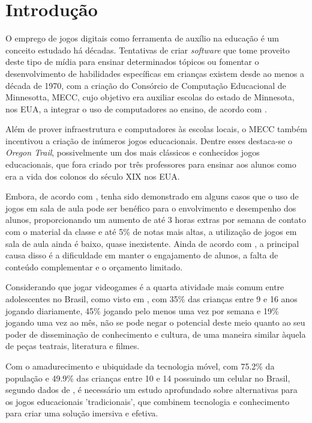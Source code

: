 \chapter{Introdução}

O emprego de jogos digitais como ferramenta de auxílio na 
educação é um conceito estudado há décadas. Tentativas de 
criar \textit{software} que tome proveito deste tipo de 
mídia para ensinar determinados tópicos ou fomentar o 
desenvolvimento de habilidades específicas em crianças 
existem desde ao menos a década de 1970, com a criação do 
Consórcio de Computação Educacional de Minnesotta, MECC, 
cujo objetivo era auxiliar escolas do estado de Minnesota, 
nos EUA, a integrar o uso de computadores ao ensino, de 
acordo com \cite{lussenhop:2016:oregon-trail}.

Além de prover infraestrutura e computadores às escolas 
locais, o MECC também incentivou a criação de inúmeros 
jogos educacionais. Dentre esses destaca-se o 
\textit{Oregon Trail}, possivelmente um dos mais 
clássicos e conhecidos jogos educacionais, que fora 
criado por três professores para ensinar aos alunos 
como era a vida dos colonos do século XIX nos EUA. 

Embora, de acordo com \cite{poli:2012:video-game-spore}, 
tenha sido demonstrado em alguns casos que o uso de 
jogos em sala de aula pode ser benéfico para o 
envolvimento e desempenho dos alunos, proporcionando 
um aumento de até 3 horas extras por semana de contato 
com o material da classe e até 5\% de notas mais 
altas, a utilização de jogos em sala de aula ainda 
é baixo, quase inexistente. Ainda de acordo com 
\cite{poli:2012:video-game-spore}, a principal causa 
disso é a dificuldade em manter o engajamento de 
alunos, a falta de conteúdo complementar e o orçamento 
limitado.

Considerando que jogar videogames é a quarta atividade 
mais comum entre adolescentes no Brasil, como visto em 
\cite{bndes:2014:mapeamento}, com 35\% das crianças 
entre 9 e 16 anos jogando diariamente, 45\% jogando 
pelo menos uma vez por semana e 19\% jogando uma vez 
ao mês, não se pode negar o potencial deste meio quanto 
ao seu poder de disseminação de conhecimento e cultura, 
de uma maneira similar àquela de peças teatrais, 
literatura e filmes.

Com o amadurecimento e ubiquidade da tecnologia móvel, 
com 75.2\% da população e 49.9\% das crianças entre 10 
e 14 possuindo um celular no Brasil, segundo dados de 
\cite{IBGE:2015:PNAD_TIC_2013}, é necessário um estudo 
aprofundado sobre alternativas para os jogos educacionais 
'tradicionais', que combinem tecnologia e conhecimento 
para criar uma solução imersiva e efetiva.

